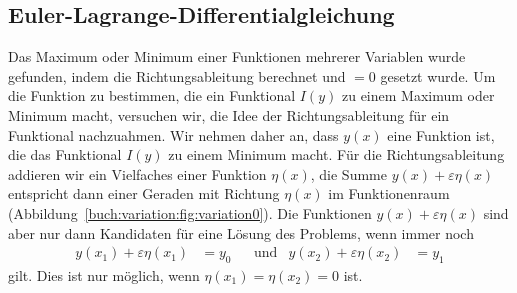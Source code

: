 %
%
%

%
%
\subsection{Euler-Lagrange-Differentialgleichung
\label{buch:variation:eulerlagrange:subsection:dgl}}

Das Maximum oder Minimum einer Funktionen mehrerer Variablen wurde
gefunden, indem die Richtungsableitung berechnet und $=0$ gesetzt
wurde.
Um die Funktion zu bestimmen, die ein Funktional $I(y)$ zu einem
Maximum oder Minimum macht, versuchen wir, die Idee der Richtungsableitung
für ein Funktional nachzuahmen.
Wir nehmen daher an, dass $y(x)$ eine Funktion ist, die das Funktional
$I(y)$ zu einem Minimum macht.
Für die Richtungsableitung addieren wir ein Vielfaches einer
Funktion $\eta(x)$, die Summe $y(x)+\varepsilon\eta(x)$ entspricht
dann einer Geraden mit Richtung $\eta(x)$ im Funktionenraum
(Abbildung~\ref{buch:variation:fig:variation0}).
Die Funktionen $y(x)+\varepsilon\eta(x)$ sind aber nur dann Kandidaten
für eine Lösung des Problems, wenn immer noch
\begin{align*}
y(x_1) + \varepsilon \eta(x_1) &= y_0
&&\text{und}&
y(x_2) + \varepsilon \eta(x_2) &= y_1
\end{align*}
gilt.
Dies ist nur möglich, wenn $\eta(x_1)=\eta(x_2)=0$ ist.

%
%

